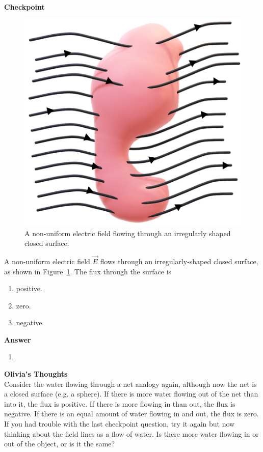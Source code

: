 \begin{framed}
\textbf{Checkpoint}\\
\begin{figure}[!htbp]
\centering
\includegraphics[width=0.25\linewidth]{files/irregularfield-0ce5dc8f672cf41596e1d051d4a15239.png}
\caption[]{A non-uniform electric field flowing through an irregularly shaped closed surface.}
\label{fig:gauss:irregularfield}
\end{figure}

A non-uniform electric field $\vec E$ flows through an irregularly-shaped closed surface, as shown in Figure~\ref{fig:gauss:irregularfield}. The flux through the surface is

\begin{enumerate}
\item positive.
\item zero.
\item negative.
\end{enumerate}

\begin{framed}
\textbf{Answer}\\
\begin{enumerate}[resume]
\item
\end{enumerate}
\end{framed}
\end{framed}

\begin{framed}
\textbf{Olivia's Thoughts}\\
Consider the water flowing through a net analogy again, although now the net is a closed surface (e.g. a sphere). If there is more water flowing out of the net than into it, the flux is positive. If there is more flowing in than out, the flux is negative. If there is an equal amount of water flowing in and out, the flux is zero. If you had trouble with the last checkpoint question, try it again but now thinking about the field lines as a flow of water. Is there more water flowing in or out of the object, or is it the same?
\end{framed}

